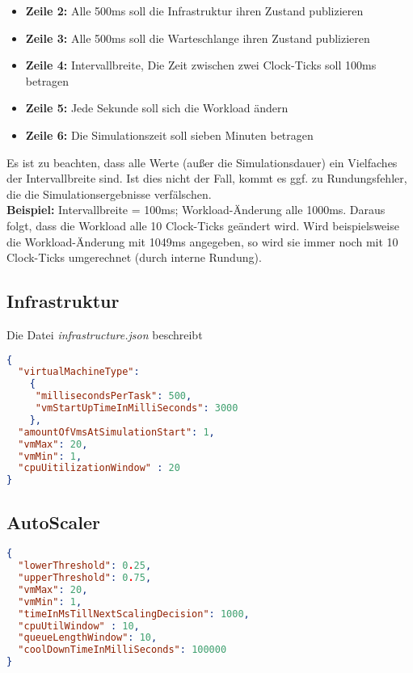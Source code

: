 \begin{itemize}
	\item \textbf{Zeile 2:} Alle 500ms soll die Infrastruktur ihren Zustand publizieren
	\item \textbf{Zeile 3:} Alle 500ms soll die Warteschlange ihren Zustand publizieren
	\item \textbf{Zeile 4:} Intervallbreite, Die Zeit zwischen zwei Clock-Ticks soll 100ms betragen 
	\item \textbf{Zeile 5:} Jede Sekunde soll sich die Workload ändern
	\item \textbf{Zeile 6:} Die Simulationszeit soll sieben Minuten betragen
	
\end{itemize}
\noindent
Es ist zu beachten, dass alle Werte (außer die Simulationsdauer) ein Vielfaches der Intervallbreite sind. Ist dies nicht der Fall, kommt es ggf. zu Rundungsfehler, die die Simulationsergebnisse verfälschen. \\
 \textbf{Beispiel:} Intervallbreite = 100ms; Workload-Änderung alle 1000ms. Daraus folgt, dass die Workload alle 10 Clock-Ticks geändert wird. Wird beispielsweise die Workload-Änderung mit 1049ms angegeben, so wird sie immer noch mit 10 Clock-Ticks umgerechnet (durch interne Rundung).
 


\subsection{Infrastruktur}
Die Datei \textit{infrastructure.json} beschreibt

\begin{lstlisting}[language=json,firstnumber=1]
{
  "virtualMachineType": 
    {
     "millisecondsPerTask": 500,
     "vmStartUpTimeInMilliSeconds": 3000
    },
  "amountOfVmsAtSimulationStart": 1,
  "vmMax": 20,
  "vmMin": 1,
  "cpuUitilizationWindow" : 20
}
\end{lstlisting}

\subsection{AutoScaler}

\begin{lstlisting}[language=json,firstnumber=1]
{
  "lowerThreshold": 0.25,
  "upperThreshold": 0.75,
  "vmMax": 20,
  "vmMin": 1,
  "timeInMsTillNextScalingDecision": 1000,
  "cpuUtilWindow" : 10,
  "queueLengthWindow": 10,
  "coolDownTimeInMilliSeconds": 100000
}
\end{lstlisting}

